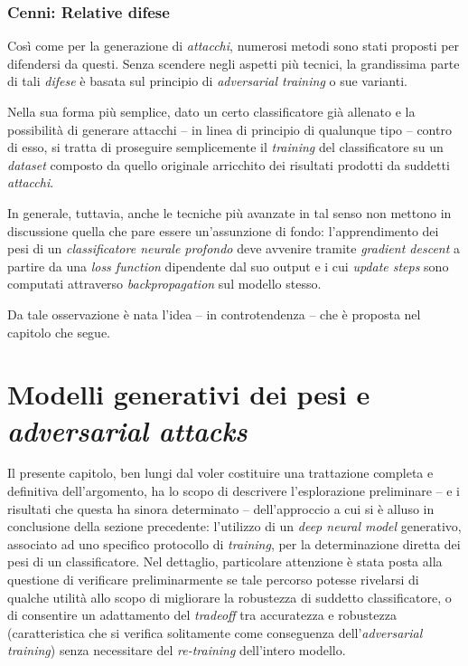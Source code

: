 \documentclass[a4paper, twoside]{article}
\begin{document}
\subsubsection{Cenni: Relative difese}

Così come per la generazione di \textit{attacchi}, numerosi metodi sono stati proposti per difendersi da questi. Senza scendere negli aspetti più tecnici, la grandissima parte di tali \textit{difese} è basata sul principio di \textit{adversarial training} o sue varianti.

Nella sua forma più semplice, dato un certo classificatore già allenato e la possibilità di generare attacchi -- in linea di principio di qualunque tipo -- contro di esso, si tratta di proseguire semplicemente il \textit{training} del classificatore su un \textit{dataset} composto da quello originale arricchito dei risultati prodotti da suddetti \textit{attacchi}.

In generale, tuttavia, anche le tecniche più avanzate in tal senso non mettono in discussione quella che pare essere un'assunzione di fondo: l'apprendimento dei pesi di un \textit{classificatore neurale profondo} deve avvenire tramite \textit{gradient descent} a partire da una \textit{loss function} dipendente dal suo output e i cui \textit{update steps} sono computati attraverso \textit{backpropagation} sul modello stesso.

Da tale osservazione è nata l'idea -- in controtendenza -- che è proposta nel capitolo che segue.


\newpage
\section{Modelli generativi dei pesi e \textit{adversarial attacks}}

Il presente capitolo, ben lungi dal voler costituire una trattazione completa e definitiva dell'argomento, ha lo scopo di descrivere l'esplorazione preliminare -- e i risultati che questa ha sinora determinato -- dell'approccio a cui si è alluso in conclusione della sezione precedente: l'utilizzo di un \textit{deep neural model} generativo, associato ad uno specifico protocollo di \textit{training}, per la determinazione diretta dei pesi di un classificatore. Nel dettaglio, particolare attenzione è stata posta alla questione di verificare preliminarmente se tale percorso potesse rivelarsi di qualche utilità allo scopo di migliorare la robustezza di suddetto classificatore, o di consentire un adattamento del \textit{tradeoff} tra accuratezza e robustezza (caratteristica che si verifica solitamente come conseguenza dell'\textit{adversarial training}) senza necessitare del \textit{re-training} dell'intero modello.
\end{document}
